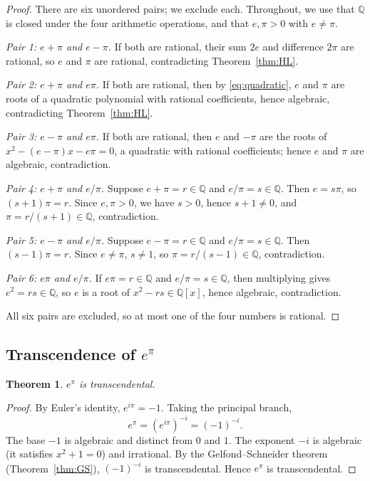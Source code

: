 \documentclass[11pt]{amsart}
\newtheorem{theorem}{Theorem}[section]
\theoremstyle{definition}
\theoremstyle{remark}
\numberwithin{equation}{section}
\newcommand{\Q}{\mathbb{Q}}
\newcommand{\ee}{e}
\begin{document}
\begin{proof}
There are six unordered pairs; we exclude each. Throughout, we use that $\Q$ is closed under the four arithmetic operations, and that $e,\pi>0$ with $e\ne\pi$.

\emph{Pair 1: $e+\pi$ and $e-\pi$.} If both are rational, their sum $2e$ and difference $2\pi$ are rational, so $e$ and $\pi$ are rational, contradicting Theorem~\ref{thm:HL}.

\emph{Pair 2: $e+\pi$ and $e\pi$.} If both are rational, then by \eqref{eq:quadratic}, $e$ and $\pi$ are roots of a quadratic polynomial with rational coefficients, hence algebraic, contradicting Theorem~\ref{thm:HL}.

\emph{Pair 3: $e-\pi$ and $e\pi$.} If both are rational, then $e$ and $-\pi$ are the roots of $x^2-(e-\pi)x-e\pi=0$, a quadratic with rational coefficients; hence $e$ and $\pi$ are algebraic, contradiction.

\emph{Pair 4: $e+\pi$ and $e/\pi$.} Suppose $e+\pi=r\in\Q$ and $e/\pi=s\in\Q$. Then $e=s\pi$, so $(s+1)\pi=r$. Since $e,\pi>0$, we have $s>0$, hence $s+1\ne0$, and $\pi=r/(s+1)\in\Q$, contradiction.

\emph{Pair 5: $e-\pi$ and $e/\pi$.} Suppose $e-\pi=r\in\Q$ and $e/\pi=s\in\Q$. Then $(s-1)\pi=r$. Since $e\ne\pi$, $s\ne1$, so $\pi=r/(s-1)\in\Q$, contradiction.

\emph{Pair 6: $e\pi$ and $e/\pi$.} If $e\pi=r\in\Q$ and $e/\pi=s\in\Q$, then multiplying gives $e^2=rs\in\Q$, so $e$ is a root of $x^2-rs\in\Q[x]$, hence algebraic, contradiction.

All six pairs are excluded, so at most one of the four numbers is rational.
\end{proof}

\subsection{Transcendence of \texorpdfstring{$e^\pi$}{e\^{}pi}}

\begin{theorem}\label{thm:epi}
$e^\pi$ is transcendental.
\end{theorem}

\begin{proof}
By Euler's identity, $\ee^{i\pi}=-1$. Taking the principal branch,
\[
\ee^\pi=(\ee^{i\pi})^{-i}=(-1)^{-i}.
\]
The base $-1$ is algebraic and distinct from $0$ and $1$. The exponent $-i$ is algebraic (it satisfies $x^2+1=0$) and irrational. By the Gelfond--Schneider theorem (Theorem~\ref{thm:GS}), $(-1)^{-i}$ is transcendental. Hence $\ee^\pi$ is transcendental.
\end{proof}
\end{document}
